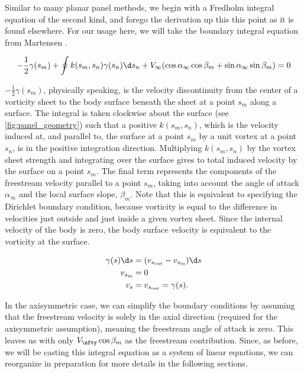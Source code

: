 Similar to many planar panel methods, we begin with a Fredholm integral equation of the second kind, and forego the derivation up this this point as it is found elsewhere.
For our usage here, we will take the boundary integral equation from Martensen \cite{Lewis_1991}.

\begin{equation}
	\label{eqn:fredholm1}
	-\frac{1}{2}\gamma(s_m) + \oint k(s_m, s_n) \gamma(s_n) \d s_n + V_\infty (\cos \alpha_\infty \cos \beta_m + \sin \alpha_\infty \sin \beta_m) = 0
\end{equation}

\where \(-\frac{1}{2}\gamma(s_m)\), physically speaking, is the velocity discontinuity from the center of a vorticity sheet to the body surface beneath the sheet at a point \(s_m\) along a surface.
The integral is taken clockwise about the surface (see \cref{fig:panel_geometry}) such that a positive \(k(s_m, s_n)\), which is the velocity induced at, and parallel to, the surface at a point \(s_m\) by a unit vortex at a point \(s_n\), is in the positive integration direction.
Multiplying \(k(s_m,s_n)\) by the vortex sheet strength and integrating over the surface gives to total induced velocity by the surface on a point \(s_m\).
The final term represents the components of the freestream velocity parallel to a point \(s_m\), taking into account the angle of attack \(\alpha_\infty\) and the local surface slope, \(\beta_m\).
Note that this is equivalent to specifying the Dirichlet boundary condition, because vorticity is equal to the difference in velocities just outside and just inside a given vortex sheet.
Since the internal velocity of the body is zero, the body surface velocity is equivalent to the vorticity at the surface.

\begin{align}
	\gamma(s)\d s &= (v_{s_\text{out}} - v_{s_\text{in}})\d s \\
	v_{s_\text{in}} &= 0 \\
	v_s &= v_{s_\text{out}} =  \gamma(s).
\end{align}

In the axisymmetric case, we can simplify the boundary conditions by assuming that the freestream velocity is solely in the axial direction (required for the axisymmetric assumption), meaning the freestream angle of attack is zero.
This leaves us with only \(V_\nfty\cos\beta_m\) as the freestream contribution.
Since, as before, we will be casting this integral equation as a system of linear equations, we can reorganize in preparation for more details in the following sections.


